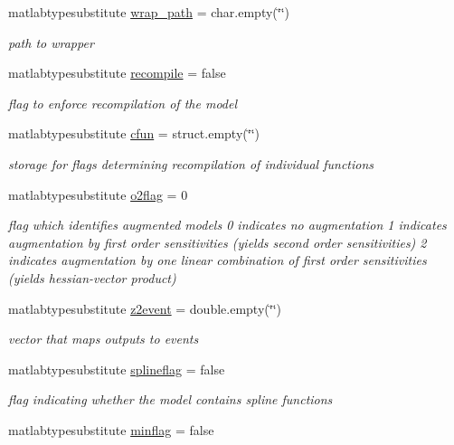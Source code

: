 \begin{DoxyCompactItemize}
matlabtypesubstitute \mbox{\hyperlink{classamimodel_a0b316a20054ba282555674d939a82406}{wrap\+\_\+path}} = char.\+empty(\char`\"{}\char`\"{})
\begin{DoxyCompactList}\small\item\em path to wrapper \end{DoxyCompactList}\item 
matlabtypesubstitute \mbox{\hyperlink{classamimodel_a8d2e824e03e32034b634a7c48f2a26c6}{recompile}} = false
\begin{DoxyCompactList}\small\item\em flag to enforce recompilation of the model \end{DoxyCompactList}\item 
matlabtypesubstitute \mbox{\hyperlink{classamimodel_afec809c626a350367485aa6aaea6b585}{cfun}} = struct.\+empty(\char`\"{}\char`\"{})
\begin{DoxyCompactList}\small\item\em storage for flags determining recompilation of individual functions \end{DoxyCompactList}\item 
matlabtypesubstitute \mbox{\hyperlink{classamimodel_a2b89e3b4e249878a2d436ee337952c4f}{o2flag}} = 0
\begin{DoxyCompactList}\small\item\em flag which identifies augmented models 0 indicates no augmentation 1 indicates augmentation by first order sensitivities (yields second order sensitivities) 2 indicates augmentation by one linear combination of first order sensitivities (yields hessian-\/vector product) \end{DoxyCompactList}\item 
matlabtypesubstitute \mbox{\hyperlink{classamimodel_a7a7be015feeb7a346dceccd49e622b4b}{z2event}} = double.\+empty(\char`\"{}\char`\"{})
\begin{DoxyCompactList}\small\item\em vector that maps outputs to events \end{DoxyCompactList}\item 
matlabtypesubstitute \mbox{\hyperlink{classamimodel_abea45d67286ebbf35dcbc12e335ffd51}{splineflag}} = false
\begin{DoxyCompactList}\small\item\em flag indicating whether the model contains spline functions \end{DoxyCompactList}\item 
matlabtypesubstitute \mbox{\hyperlink{classamimodel_affead4b7a87bc135fea91fd5aada78a8}{minflag}} = false

\end{DoxyCompactItemize}
